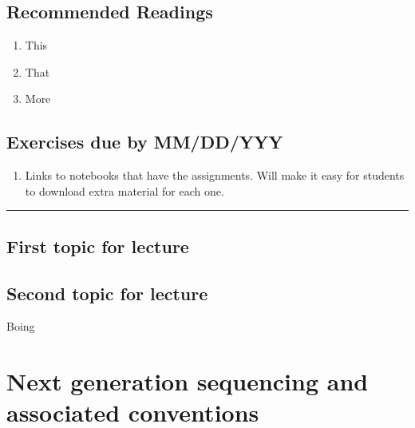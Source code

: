\documentclass[]{book}
\providecommand{\tightlist}{%
  \setlength{\itemsep}{0pt}\setlength{\parskip}{0pt}}
\begin{document}
\hypertarget{recommended-readings-1}{%
\section*{Recommended Readings}\label{recommended-readings-1}}

\begin{enumerate}
\def\labelenumi{\arabic{enumi}.}
\tightlist
\item
  This
\item
  That
\item
  More
\end{enumerate}

\hypertarget{exercises-due-by-mmddyyy-1}{%
\section*{Exercises due by MM/DD/YYY}\label{exercises-due-by-mmddyyy-1}}

\begin{enumerate}
\def\labelenumi{\arabic{enumi}.}
\tightlist
\item
  Links to notebooks that have the assignments. Will make it
  easy for students to download extra material for each one.
\end{enumerate}

\begin{center}\rule{0.5\linewidth}{\linethickness}\end{center}

\hypertarget{first-topic-for-lecture-1}{%
\section{First topic for lecture}\label{first-topic-for-lecture-1}}

\hypertarget{second-topic-for-lecture-1}{%
\section{Second topic for lecture}\label{second-topic-for-lecture-1}}

Boing

\hypertarget{next-generation-sequencing-and-associated-conventions}{%
\chapter{Next generation sequencing and associated conventions}\label{next-generation-sequencing-and-associated-conventions}}
\end{document}
